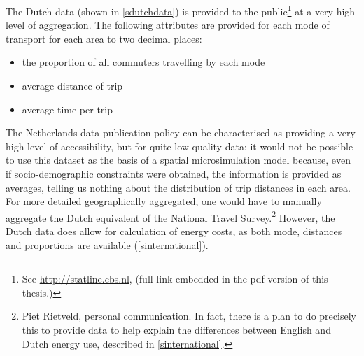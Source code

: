 \documentclass[a4paper, 11pt, twoside]{Thesis}
\begin{document}
The Dutch data (shown in \cref{sdutchdata}) is provided to the
public\footnote{See {\color{blue}\href{http://statline.cbs.nl/StatWeb/publication/?DM=SLNL&PA=81129ned&D1=0-1,3&D2=0&D3=a&D4=1&D5=0-12&D6=a&HDR=T&STB=G1,G2,G3,G4,G5&VW=T}{http://statline.cbs.nl}},
(full link embedded in the pdf version of this thesis.)} at a
very high level of aggregation. The following attributes are provided for
each mode of transport for each area to two decimal places:
\begin{itemize}
 \item the proportion of all commuters travelling by each mode
 \item average distance of trip
 \item average time per trip
\end{itemize}
The Netherlands data publication policy can be characterised as providing
a very high level of accessibility, but for quite low quality data: it would
not be possible to use this dataset as the basis of a spatial microsimulation
model because, even if socio-demographic constraints were obtained, the
information is provided as averages, telling us nothing about the distribution
of trip distances in each area.
For more detailed geographically aggregated, one would have to
manually aggregate the Dutch equivalent of the National Travel
Survey.\footnote{Piet Rietveld, personal communication.
In fact, there is a plan to do precisely this to provide data to help
explain the differences between English and Dutch energy use, described in
\cref{sinternational}.}
However, the Dutch data does allow for calculation of energy costs, as both
mode, distances and proportions are available (\cref{sinternational}).
\end{document}
